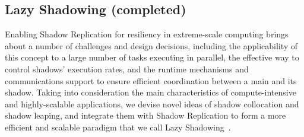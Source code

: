 


\subsection{Lazy Shadowing (completed)}

Enabling Shadow Replication for resiliency in extreme-scale computing brings about a number of challenges and design decisions, including the applicability of this concept to a large number of tasks executing in parallel, 
the effective way to control shadows’ execution rates, and the runtime mechanisms and communications support to ensure efficient 
coordination between a main and its shadow. Taking into consideration the main characteristics of compute-intensive and 
highly-scalable applications, 
we devise novel ideas of shadow collocation and shadow leaping, and integrate them with Shadow Replication to form a more efficient and scalable paradigm that we call Lazy Shadowing~\cite{cui_2016_scalcom}.

%

